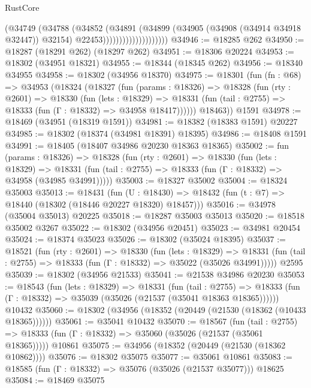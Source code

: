 \begin{lexlean}{RustCore}
\begin{coremodule}
                                  (@34749
                                    (@34788
                                      (@34852
                                        (@34891
                                          (@34899
                                            (@34905 (@34908 (@34914 @34918 @32447)) @32154)
                                            @22453))))))))))))))))))))
@34946 := @18285 @262
@34950 := @18287 (@18291 @262) (@18297 @262)
@34951 := @18306 @20224
@34953 := @18302 (@34951 @18321)
@34955 := @18344 (@18345 @262)
@34956 := @18340 @34955
@34958 := @18302 (@34956 @18370)
@34975 := @18301
    (fun (fn : @68) =>
    @34953
      (@18324
        (@18327
          (fun (params : @18326) =>
          @18328
            (fun (rty : @2601) =>
            @18330
              (fun (lets : @18329) =>
              @18331 (fun (tail : @2755) => @18333 (fun (Γ : @18332) => @34958 @18417))))))
        @18463))
    @1591
@34978 := @18469 (@34951 (@18319 @1591))
@34981 := @18382 (@18383 @1591) @20227
@34985 := @18302 (@18374 (@34981 @18391) @18395)
@34986 := @18408 @1591
@34991 := @18405 (@18407 @34986 @20230 @18363 @18365)
@35002 := fun (params : @18326) =>
  @18328
    (fun (rty : @2601) =>
    @18330
      (fun (lets : @18329) =>
      @18331 (fun (tail : @2755) => @18333 (fun (Γ : @18332) => @34958 (@34985 @34991)))))
@35003 := @18327 @35002
@35004 := @18324 @35003
@35013 := @18431
    (fun (U : @18430) => @18432 (fun (t : @7) => @18440 (@18302 (@18446 @20227 @18320) @18457)))
@35016 := @34978 (@35004 @35013) @20225
@35018 := @18287 @35003 @35013
@35020 := @18518 @35002 @3267
@35022 := @18302 (@34956 @20451)
@35023 := @34981 @20454
@35024 := @18374 @35023
@35026 := @18302 (@35024 @18395)
@35037 := @18521
    (fun (rty : @2601) =>
    @18330
      (fun (lets : @18329) =>
      @18331 (fun (tail : @2755) => @18333 (fun (Γ : @18332) => @35022 (@35026 @34991)))))
    @2595
@35039 := @18302 (@34956 @21533)
@35041 := @21538 @34986 @20230
@35053 := @18543
    (fun (lets : @18329) =>
    @18331
      (fun (tail : @2755) =>
      @18333 (fun (Γ : @18332) => @35039 (@35026 (@21537 (@35041 @18363 @18365))))))
    @10432
@35060 := @18302 (@34956 (@18352 (@20449 (@21530 (@18362 (@10433 @18365))))))
@35061 := @35041 @10432
@35070 := @18567
    (fun (tail : @2755) => @18333 (fun (Γ : @18332) => @35060 (@35026 (@21537 (@35061 @18365)))))
    @10861
@35075 := @34956 (@18352 (@20449 (@21530 (@18362 @10862))))
@35076 := @18302 @35075
@35077 := @35061 @10861
@35083 := @18585 (fun (Γ : @18332) => @35076 (@35026 (@21537 @35077))) @18625
@35084 := @18469 @35075

\end{coremodule}
\end{lexlean}
